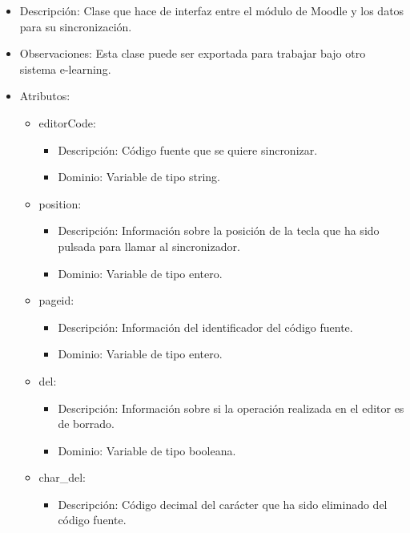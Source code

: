 \begin{itemize}
	\item Descripción: Clase que hace de interfaz entre el módulo de Moodle y los datos para su sincronización.
	\item Observaciones: Esta clase puede ser exportada para trabajar bajo otro sistema e-learning.
	\item Atributos:
		\begin{itemize}
			\item editorCode:
				\begin{itemize}
					\item Descripción: Código fuente que se quiere sincronizar.
					\item Dominio: Variable de tipo string.
				\end{itemize}
		\end{itemize}
		\begin{itemize}
			\item position:
				\begin{itemize}
					\item Descripción: Información sobre la posición de la tecla que ha sido pulsada para llamar al sincronizador.
					\item Dominio: Variable de tipo entero.
				\end{itemize}
		\end{itemize}
		\begin{itemize}
			\item pageid:
				\begin{itemize}
					\item Descripción: Información del identificador del código fuente.
					\item Dominio: Variable de tipo entero.
				\end{itemize}
		\end{itemize}
		\begin{itemize}
			\item del:
				\begin{itemize}
					\item Descripción: Información sobre si la operación realizada en el editor es de borrado.
					\item Dominio: Variable de tipo booleana.
				\end{itemize}
		\end{itemize}
		\begin{itemize}
			\item char\_del:
				\begin{itemize}
					\item Descripción: Código decimal del carácter que ha sido eliminado del código fuente.

\end{itemize}
\end{itemize}
\end{itemize}
